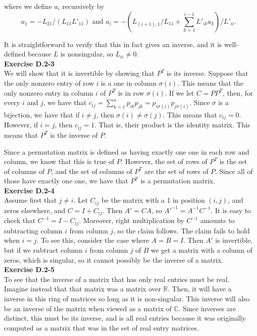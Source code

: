\documentclass{article}
\begin{document}
where we define $a_i$ recursively by 
\[ a_1 = -L_{21}/(L_{11}L'_{11})  \mbox{ and } a_i = -\left(L_{(i+1),1}/L_{11} + \sum_{k=1}^{i-1} L'_{ik}a_k \right)/L'_{ii}.\]

It is straightforward to verify that this in fact gives an inverse, and it is well-defined because $L$ is nonsingular, so $L_{ii} \neq 0$.  \\

\noindent\textbf{Exercise D.2-3}\\
We will show that it is invertible by showing that $P^T$ is its inverse. Suppose that the only nonzero entry of row $i$ is a one in column $\sigma(i)$. This means that the only nonzero entry in column $i$ of $P^T$ is in row $\sigma(i)$. If we let $C = PP^T$, then, for every $i$ and $j$, we have that $c_{ij} = \sum_{k=1}^n p_{ik}p_{jk} =  p_{i\sigma(i)}p_{j\sigma(i)}$. Since $\sigma$ is a bijection, we have that if $i\neq j$, then $\sigma(i)\neq \sigma(j)$. This means that $c_{ij}=0$. However, if $i=j$, then $c_{ij} =1$. That is, their product is the identity matrix. This means that $P^T$ is the inverse of $P$. 

Since a permutation matrix is defined as having exactly one one in each row and column, we know that this is true of $P$. However, the set of rows of $P^T$ is the set of columns of $P$, and the set of columns of $P^T$ are the set of rows of $P$. Since all of those have exactly one one, we have that $P^T$ is a permutation matrix.\\

\noindent\textbf{Exercise D.2-4}\\

Assume first that $j\neq i$.  Let $C_{ij}$ be the matrix with a 1 in position $(i,j)$, and zeros elsewhere, and $C = I + C_{ij}$.  Then $A' = CA$, so $A'^{-1} = A^{-1}C^{-1}$.  It is easy to check that $C^{-1} = I-C_{ij}$.  Moreover, right multiplication by $C^{-1}$ amounts to subtracting column $i$ from column $j$, so the claim follows.  The claim fails to hold when $i=j$.  To see this, consider the case where $A = B = I$.  Then $A'$ is invertible, but if we subtract column $i$ from column $j$ of $B$ we get a matrix with a column of zeros, which is singular, so it cannot possibly be the inverse of a matrix.  \\

\noindent\textbf{Exercise D.2-5}\\

To see that the inverse of a matrix that has only real entries must be real. Imagine instead that that matrix was a matrix over $\mathbb{R}$. Then, it will have a inverse in this ring of matrices so long as it is non-singular. This inverse will also be an inverse of the matrix when viewed as a matrix of $\mathbb{C}$. Since inverses are distinct, this must be its inverse, and is all real entries because it was originally computed as a matrix that was in the set of real entry matrices.
\end{document}
